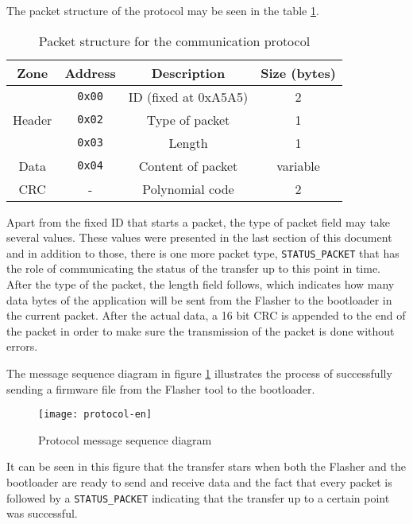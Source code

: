 \documentclass[10pt,a4paper,twoside]{article}
\begin{document}
The packet structure of the protocol may be seen in the table \ref{protoStruct}.

\begin{table}[h]
    \begin{tabular}{ | c | c | c | c | }
        \hline
        \textbf{Zone} & \textbf{Address} & \textbf{Description} & \textbf{Size (bytes)} \\ \hline
        \multirow{3}{*}{Header} & \texttt{0x00} & ID (fixed at 0xA5A5) & 2 \\ \cline{2-4}
                               & \texttt{0x02} & Type of packet & 1 \\ \cline{2-4}
                               & \texttt{0x03} & Length & 1 \\ \hline   
        Data                   & \texttt{0x04} & Content of packet & variable \\ \hline
        CRC                    & - & Polynomial code & 2 \\ \hline
    \end{tabular}
    \centering
    \caption{Packet structure for the communication protocol}
    \label{protoStruct}
\end{table}

Apart from the fixed ID that starts a packet, the type of packet field may take several values. These values were presented in the last section of this document and in addition to those, there is one more packet type, \texttt{STATUS\_PACKET} that has the role of communicating the status of the transfer up to this point in time.
After the type of the packet, the length field follows, which indicates how many data bytes of the application will be sent from the Flasher to the bootloader in the current packet. After the actual data, a 16 bit CRC is appended to the end of the packet in order to make sure the transmission of the packet is done without errors.

The message sequence diagram in figure \ref{protocol-msd} illustrates the process of successfully sending a firmware file from the Flasher tool to the bootloader.

\begin{figure}[H]
    \centering
    \texttt{[image: protocol-en]}
    \caption{Protocol message sequence diagram}
    \label{protocol-msd}
\end{figure}

It can be seen in this figure that the transfer stars when both the Flasher and the bootloader are ready to send and receive data and the fact that every packet is followed by a \texttt{STATUS\_PACKET} indicating that the transfer up to a certain point was successful.
\end{document}
